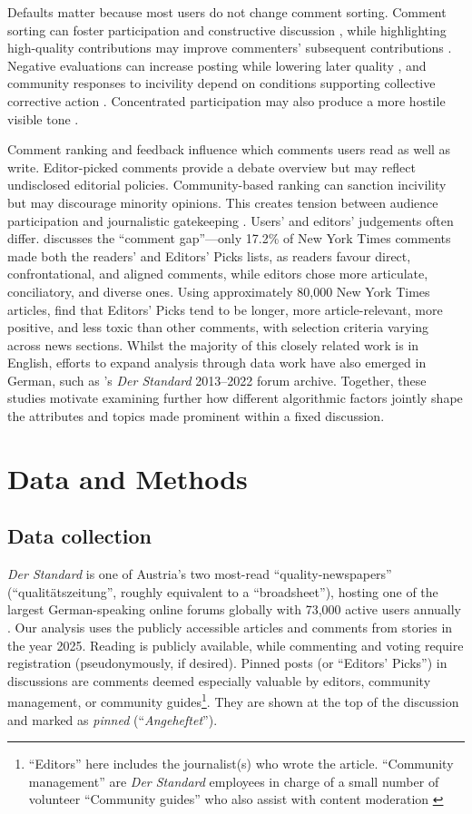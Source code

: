 Defaults matter because most users do not change comment sorting. Comment sorting can foster participation and constructive discussion \citep{Diakopoulos2011}, while highlighting high-quality contributions may improve commenters’ subsequent contributions \citep{Wang2021}. Negative evaluations can increase posting while lowering later quality \citep{Cheng2014}, and community responses to incivility depend on conditions supporting collective corrective action \citep{Ziegele2020}. Concentrated participation may also produce a more hostile visible tone \citep{KimNoh2026}.

Comment ranking and feedback influence which comments users read as well as write. Editor-picked comments provide a debate overview but may reflect undisclosed editorial policies. Community-based ranking can sanction incivility but may discourage minority opinions. This creates tension between audience participation and journalistic gatekeeping \citep{Chen2017, Diakopoulos2015}. Users' and editors' judgements often differ. \citet{JuarezMiro2022} discusses the ``comment gap''---only 17.2\% of New York Times comments made both the readers' and Editors' Picks lists, as readers favour direct, confrontational, and aligned comments, while editors chose more articulate, conciliatory, and diverse ones. Using approximately 80,000 New York Times articles, \citet{He2024} find that Editors' Picks tend to be longer, more article-relevant, more positive, and less toxic than other comments, with selection criteria varying across news sections. Whilst the majority of this closely related work is in English, efforts to expand analysis through data work have also emerged in German, such as \citet{Fraxanet2026}'s \textit{Der Standard} 2013--2022 forum archive. Together, these studies motivate examining further how different algorithmic factors jointly shape the attributes and topics made prominent within a fixed discussion.

\section{Data and Methods}
\label{sec:data}
\subsection{Data collection}
\textit{Der Standard} is one of Austria's two most-read ``quality-newspapers'' (``qualitätszeitung'', roughly equivalent to a ``broadsheet''), hosting one of the largest German-speaking online forums globally with 73,000 active users annually \citep{Burger2022}. Our analysis uses the publicly accessible articles and comments from stories in the year 2025. Reading is publicly available, while commenting and voting require registration (pseudonymously, if desired). Pinned posts (or ``Editors' Picks'') in discussions are comments deemed especially valuable by editors, community management, or community guides\footnote{``Editors'' here includes the journalist(s) who wrote the article. ``Community management'' are \textit{Der Standard} employees in charge of a small number of volunteer ``Community guides'' who also assist with content moderation \citep{DerStandard2021}}. They are shown at the top of the discussion and marked as \emph{pinned} (``\emph{Angeheftet}'').

